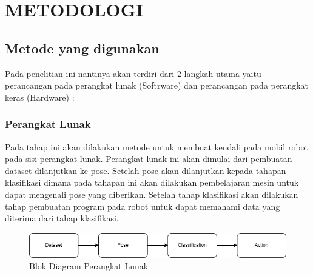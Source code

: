 \section{METODOLOGI}


\subsection{Metode yang digunakan}

Pada penelitian ini nantinya akan terdiri dari 2 langkah utama yaitu perancangan pada perangkat lunak (Softrware) dan perancangan pada perangkat keras (Hardware) :

\subsubsection{Perangkat Lunak}
Pada tahap ini akan dilakukan metode untuk membuat kendali pada mobil robot pada sisi perangkat lunak. Perangkat lunak ini akan dimulai dari pembuatan dataset dilanjutkan ke pose. Setelah pose akan dilanjutkan kepada tahapan klasifikasi dimana pada tahapan ini akan dilakukan pembelajaran mesin untuk dapat mengenali pose yang diberikan. Setelah tahap klasifikasi akan dilakukan tahap pembuatan program pada robot untuk dapat memahami data yang diterima dari tahap klasifikasi.

\begin{figure}[!h]
	\centering
	\includegraphics[width=1\linewidth]{gambar/gambar3.1}
	\caption{Blok Diagram Perangkat Lunak}
	\label{fig:gambar31}
\end{figure}

